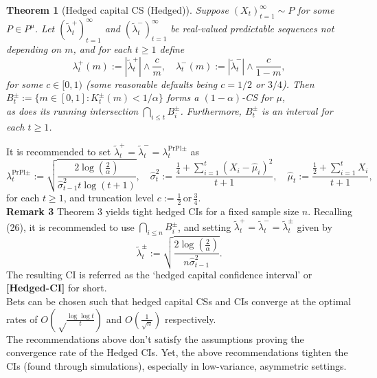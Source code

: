 \documentclass{article}
\renewcommand{\leq}{\leqslant}
\renewcommand{\geq}{\geqslant}
\newtheorem{theorem}{Theorem}
\begin{document}
\begin{theorem}[Hedged capital CS (Hedged)]  
Suppose \( (X_t)_{t=1}^{\infty} \sim P \) for some \( P \in P^{\mu} \). Let \( (\tilde{\lambda}^+_t)_{t=1}^{\infty} \) and \( (\tilde{\lambda}^-_t)_{t=1}^{\infty} \) be real-valued predictable sequences not depending on \( m \), and for each \( t \geq 1 \) define  
\begin{equation}  
\lambda^+_t (m) := |\tilde{\lambda}^+_t| \wedge \frac{c}{m}, \quad  
\lambda^-_t (m) := |\tilde{\lambda}^-_t| \wedge \frac{c}{1 - m},  
\end{equation}  
for some \( c \in [0,1) \) (some reasonable defaults being \( c = 1/2 \) or \( 3/4 \)). Then\\

$ B^\pm_t := \{ m \in [0,1] : K^\pm_t (m) < 1/\alpha \} $ forms a \( (1 - \alpha) \)-CS for \( \mu \), \\

as does its running intersection \( \bigcap_{i \leq t} B^\pm_i \). Furthermore, \( B^\pm_t \) is an interval for each \( t \geq 1 \).  
\end{theorem}  
It is recommended to set \( \tilde{\lambda}^+_t = \tilde{\lambda}^-_t = \lambda^{\text{PrPl}\pm}_t \) as
\begin{equation} \label{eq:26}
   \lambda^{\text{PrPl}\pm}_t := \sqrt{\frac{2 \log (\frac{2}{\alpha})}{\hat{\sigma}^2_{t-1}t \log (t + 1)}}, \quad \hat{\sigma}^2_t := \frac{\frac{1}{4} + \sum_{i=1}^{t} (X_i - \hat{\mu}_i)^2}{t + 1}, \quad \hat{\mu}_t := \frac{\frac{1}{2}+ \sum_{i=1}^{t} X_i}{t + 1},
\end{equation}
for each \( t \geq 1 \), and truncation level \( c := \frac{1}{2} \, \text{or} \, \frac{3}{4}
 \). \\
 
\noindent \textbf{Remark 3} \quad Theorem 3 yields tight hedged CIs for a fixed sample size \( n \). Recalling (26), it is recommended to use \( \bigcap_{i \leq n} B^\pm_i \), and setting \( \tilde{\lambda}^+_t = \tilde{\lambda}^-_t = \tilde{\lambda}^\pm_t \) given by
\begin{equation} \label{eq:27}
    \tilde{\lambda}^\pm_t := \sqrt{\frac{2 \log( \frac{2}{\alpha})}{n \hat{\sigma}^2_{t-1}}}.
\end{equation}
The resulting CI is referred as the ‘hedged capital confidence interval’ or \textbf{[Hedged-CI]} for short. \\

\noindent Bets can be chosen such that hedged capital CSs and CIs converge at the optimal rates of \( O \left( \sqrt\frac{\log \log t}{t} \right) \) and \( O \left( \frac{1}{\sqrt{n}} \right) \) respectively. \\ 

\noindent The recommendations above don't satisfy the assumptions proving the convergence rate of the Hedged CIs. Yet, the above recommendations tighten the CIs (found through simulations), especially in low-variance, asymmetric settings.



\end{document}
